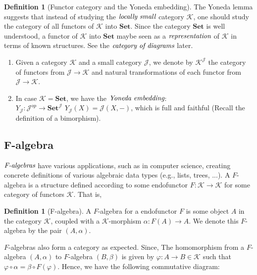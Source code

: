 \documentclass[10pt, oneside, reqno]{amsart}
\theoremstyle{plain}%
\theoremstyle{definition}
\newtheorem{defn}[thm]{Definition}
\theoremstyle{remark}
\begin{document}
\begin{defn}[Functor category and the Yoneda embedding]
The Yoneda lemma suggests that instead of studying the $\emph{locally small}$ category $\mathcal{K}$,
one should study the category of all functors of $\mathcal{K}$ into $\textbf{Set}$.
Since the category $\textbf{Set}$ is well understood, a functor of $\mathcal{K}$ into $\textbf{Set}$
maybe seen as a $\emph{representation}$ of $\mathcal{K}$ in terms of known structures.
See the $\emph{category of diagrams}$ later.
 \begin{enumerate}
  \item Given a category $\mathcal{K}$ and a small category $\mathcal{J}$, we denote by
  $\mathcal{K}^\mathcal{J}$ the category of functors from $\mathcal{J} \to \mathcal{K}$ and natural transformations
  of each functor from $\mathcal{J} \to \mathcal{K}$.
  \item In case $\mathcal{K} = \textbf{Set}$, we have the $\emph{Yoneda embedding}$:\\
  $Y_{\mathcal{J}}: \mathcal{J}^{op} \to \textbf{Set}^{\mathcal{J}}
  \, \,
  Y_{\mathcal{J}}(X) = \mathcal{J}(X, -)$, which is full and faithful (Recall the definition of a bimorphism).
 \end{enumerate}
\end{defn}


\subsection{F-algebra} %
\label{subsec:f-algebra}
$\emph{F-algebras}$ have various applications, such as in computer science,
creating concrete definitions of various algebraic data types (e.g., lists, trees, ...).
A $F$-algebra is a structure defined according to some endofunctor $F: \mathcal{K} \to \mathcal{K}$
for some category of functors $\mathcal{K}$. That is,

\begin{defn}[F-algebra]
 A $F$-algebra for a endofunctor $F$ is some object $A$ in the category $\mathcal{K}$, coupled with
 a $\mathcal{K}$-morphism $\alpha: F(A) \to A$. We denote this $F$-algebra by the pair $(A, \alpha)$.
\end{defn}

$F$-algebras also form a category as expected.
Since, The homomorphism from a $F$-algebra $(A, \alpha)$ to $F$-algebra $(B, \beta)$
is given by $\varphi: A \to B \in \mathcal{K}$ such that $\varphi \circ \alpha = \beta \circ F(\varphi)$.
Hence, we have the following commutative diagram:
\end{document}
